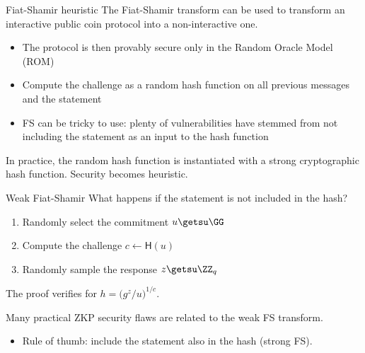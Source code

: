\begin{frame}{Fiat-Shamir heuristic}
  The Fiat-Shamir transform can be used to transform an interactive public coin protocol into a non-interactive one.
  \begin{itemize}[<+(1)->]
    \item The protocol is then provably secure only in the Random Oracle Model (ROM)
    \item Compute the challenge as a random hash function on all previous messages and the statement
    \item FS can be tricky to use: plenty of vulnerabilities have stemmed from not including the statement as an input to the hash function
  \end{itemize}

  \pause
  In practice, the random hash function is instantiated with a strong cryptographic hash function.
  Security becomes heuristic.
\end{frame}

\begin{frame}{Weak Fiat-Shamir}
  What happens if the statement is not included in the hash?

  \begin{enumerate}[<+(1)->]
    \item Randomly select the commitment $u \getsu \GG$
    \item Compute the challenge $c \gets \mathsf{H}(u)$
    \item Randomly sample the response $z \getsu \ZZ_q$
  \end{enumerate}

  \pause
  The proof verifies for $h = \bigl(g^z/u\bigr)^{1/c}$.

  \vspace*{1em}

  \pause
  Many practical ZKP security flaws are related to the weak FS transform.
  \begin{itemize}
    \item Rule of thumb: include the statement also in the hash (strong FS).
  \end{itemize}
\end{frame}

